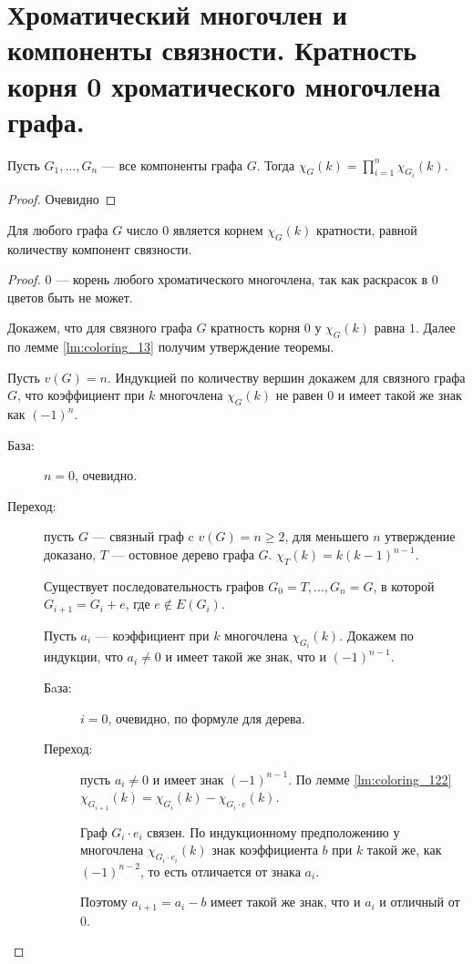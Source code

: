 \section{Хроматический многочлен и компоненты связности. Кратность корня 0 хроматического многочлена графа.}
\begin{lemma}\label{lm:coloring_13}
    Пусть  $G_1, \ldots , G_{n} $ --- все компоненты графа $G$. Тогда $\chi_{G}(k) = \prod_{i=1}^{n}\chi_{G_i}(k)$.
\end{lemma}
\begin{proof}
    Очевидно
\end{proof}

\begin{theorem}
    Для любого графа $G$ число $0$ является корнем $\chi_G(k)$ кратности, равной количеству компонент связности.
\end{theorem}
\begin{proof}
    $0$ --- корень любого хроматического многочлена, так как раскрасок в $0$ цветов быть не может.

	Докажем, что для связного графа $G$ кратность корня $0$ у $\chi_G(k)$ равна $1$. Далее по лемме \ref{lm:coloring_13} получим утверждение теоремы.

	Пусть $v(G) = n$. Индукцией по количеству вершин докажем для связного графа $G$, что коэффициент при $k$ многочлена $\chi_G(k)$ не равен $0$ и имеет такой же знак как $(-1)^{n}$.
	\begin{description}
		\item[База:] 	$n=0$, очевидно.
		\item[Переход:] пусть $G$ --- связный граф c $v(G) = n  \ge 2$, для меньшего $n$ утверждение доказано, $T$ --- остовное дерево графа $G$. $\chi_T(k) = k(k-1)^{n-1}$.

			Существует последовательность графов $ G_0 = T, \ldots , G_n = G$, в которой $G_{i+1} = G_i + e$, где $e \notin E(G_i)$.

			Пусть $a_i$ --- коэффициент при $k$ многочлена $\chi_{G_i}(k)$. Докажем по индукции, что $a_i \neq 0$ и имеет такой же знак, что и $(-1)^{n-1}$. 
			\begin{description}
				\item[Бaза:] $i=0$, очевидно, по формуле для дерева.
				\item [Переход:] пусть $a_i \neq 0$ и имеет знак $(-1)^{n-1}$. По лемме \ref{lm:coloring_122} $\chi_{G_{i+1}}(k) = \chi_{G_i}(k) - \chi_{G_i \cdot e}(k)$.
					
					Граф $G_i \cdot e_i$ связен. По индукционному предположению у многочлена $\chi_{G_i \cdot e_i}(k)$ знак коэффициента $b$ при $k$ такой же, как $(-1)^{n-2}$, то есть отличается от знака $a_{i}$.

					Поэтому $a_{i+1} = a_i - b$ имеет такой же знак, что и $a_i$ и отличный от $0$.
			\end{description}
	\end{description}
\end{proof}

